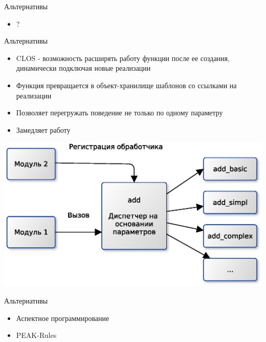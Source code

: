 \documentclass{article}
\begin{document}
\begin{center} Альтернативы \end{center}
\begin{itemize}
    \item ?
\end{itemize}
\newpage

\begin{center} Альтернативы \end{center}
\begin{itemize}
    \item CLOS - возможность расширять работу функции после ее создания,
          динамически подключая новые реализации
    \item Функция превращается в объект-хранилище шаблонов со ссылками на реализации
    \item Позволяет перегружать поведение не только по одному параметру
    \item Замедляет работу
\end{itemize}
\begin{center} \includegraphics[scale=0.8]{images/CLOS.eps} \end{center} 
\newpage

\begin{center} Альтернативы \end{center}
\begin{itemize}
    \item Аспектное программирование
    \item PEAK-Rules
\end{itemize}
\newpage
\end{document}
